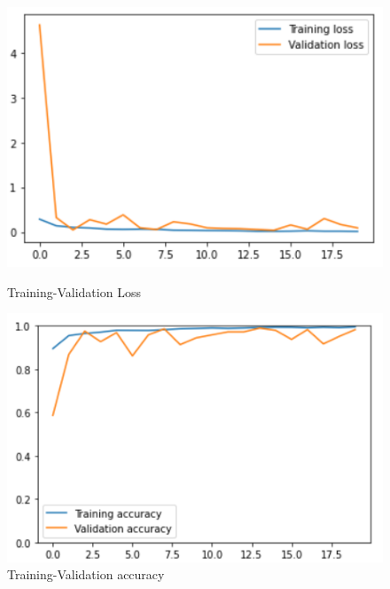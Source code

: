 \documentclass[11pt,a4paper]{article}
\theoremstyle{definition}
\begin{document}
\begin{figure}[H]
  \centering
  \begin{minipage}[b]{0.45\textwidth}
    \includegraphics[scale=0.75]{./images/v3loss}
	\caption{Training-Validation Loss}
  \end{minipage}
  \hfill
  \begin{minipage}[b]{0.45\textwidth}
    \includegraphics[scale=0.75]{./images/v3acc}
	\caption{Training-Validation accuracy}
  \end{minipage}
\end{figure}
\end{document}
